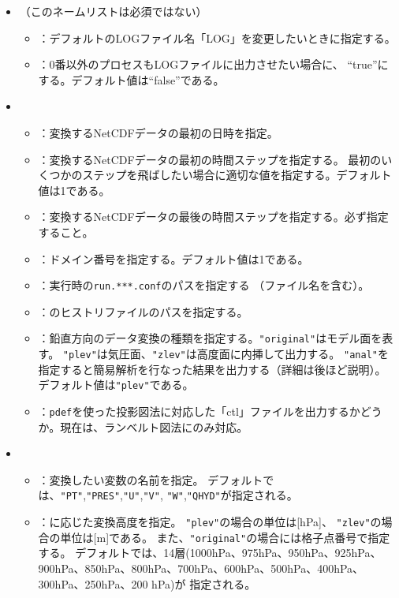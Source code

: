 \begin{itemize}
 \item {}（このネームリストは必須ではない）
 \begin{itemize}
  \item {}：デフォルトのLOGファイル名「LOG」を変更したいときに指定する。
  \item {}：0番以外のプロセスもLOGファイルに出力させたい場合に、
  ``true''にする。デフォルト値は``false''である。
 \end{itemize}
 \item {}
 \begin{itemize}
  \item {}：変換するNetCDFデータの最初の日時を指定。
  \item {}：変換するNetCDFデータの最初の時間ステップを指定する。
  最初のいくつかのステップを飛ばしたい場合に適切な値を指定する。デフォルト値は1である。
  \item {}：変換するNetCDFデータの最後の時間ステップを指定する。必ず指定すること。
  \item {}：ドメイン番号を指定する。デフォルト値は1である。
  \item {}：\scalerm 実行時の\verb|run.***.conf|のパスを指定する
        （ファイル名を含む）。
  \item {}：\scalerm のヒストリファイルのパスを指定する。
  \item {}：鉛直方向のデータ変換の種類を指定する。\verb|"original"|はモデル面を表す。
        \verb|"plev"|は気圧面、\verb|"zlev"|は高度面に内挿して出力する。
        \verb|"anal"|を指定すると簡易解析を行なった結果を出力する（詳細は後ほど説明）。
        デフォルト値は\verb|"plev"|である。
  \item {}：\verb|pdef|を使った投影図法に対応した「ctl」ファイルを出力するかどうか。現在は、ランベルト図法にのみ対応。
 \end{itemize}
 \item {}
 \begin{itemize}
  \item {}：変換したい変数の名前を指定。
  デフォルトでは、\verb|"PT"|,\verb|"PRES"|,\verb|"U"|,\verb|"V"|, \verb|"W"|,\verb|"QHYD"|が指定される。
  \item {}：に応じた変換高度を指定。
        \verb|"plev"|の場合の単位は[hPa]、
        \verb|"zlev"|の場合の単位は[m]である。
        また、\verb|"original"|の場合には格子点番号で指定する。
        デフォルトでは、14層(1000hPa、975hPa、950hPa、925hPa、900hPa、850hPa、800hPa、700hPa、600hPa、500hPa、400hPa、300hPa、250hPa、200 hPa)が
        指定される。
 \end{itemize}
\end{itemize}

